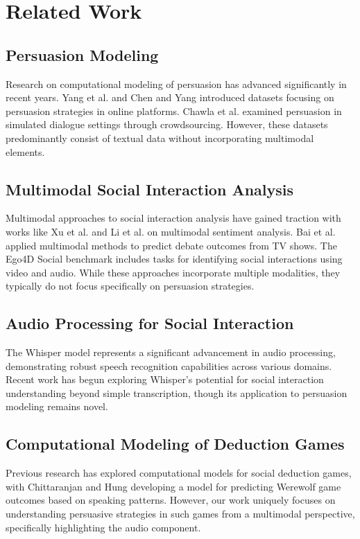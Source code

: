\documentclass{article}
\begin{document}
\section{Related Work}
\subsection{Persuasion Modeling}
Research on computational modeling of persuasion has advanced significantly in recent years. Yang et al. \cite{yang2019let} and Chen and Yang \cite{chen2021advisorqagc} introduced datasets focusing on persuasion strategies in online platforms. Chawla et al. \cite{chawla2021casino} examined persuasion in simulated dialogue settings through crowdsourcing. However, these datasets predominantly consist of textual data without incorporating multimodal elements.

\subsection{Multimodal Social Interaction Analysis}
Multimodal approaches to social interaction analysis have gained traction with works like Xu et al. \cite{xu2021learning} and Li et al. \cite{li2020deep} on multimodal sentiment analysis. Bai et al. \cite{bai2021power} applied multimodal methods to predict debate outcomes from TV shows. The Ego4D Social benchmark \cite{grauman2022ego4d} includes tasks for identifying social interactions using video and audio. While these approaches incorporate multiple modalities, they typically do not focus specifically on persuasion strategies.

\subsection{Audio Processing for Social Interaction}
The Whisper model \cite{radford2022robust} represents a significant advancement in audio processing, demonstrating robust speech recognition capabilities across various domains. Recent work has begun exploring Whisper's potential for social interaction understanding beyond simple transcription, though its application to persuasion modeling remains novel.

\subsection{Computational Modeling of Deduction Games}
Previous research has explored computational models for social deduction games, with Chittaranjan and Hung \cite{chittaranjan2010you} developing a model for predicting Werewolf game outcomes based on speaking patterns. However, our work uniquely focuses on understanding persuasive strategies in such games from a multimodal perspective, specifically highlighting the audio component.
\end{document}
